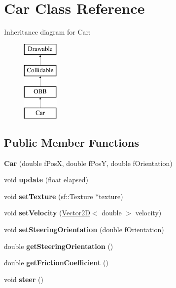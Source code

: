 \hypertarget{class_car}{}\section{Car Class Reference}
\label{class_car}
Inheritance diagram for Car\+:\begin{figure}[H]
\begin{center}
\leavevmode
\includegraphics[height=4.000000cm]{class_car}
\end{center}
\end{figure}
\subsection*{Public Member Functions}
\begin{DoxyCompactItemize}
\item 
\hypertarget{class_car_a9be5c5406459bc96efcb7378909e5834}{}{\bfseries Car} (double f\+Pos\+X, double f\+Pos\+Y, double f\+Orientation)\label{class_car_a9be5c5406459bc96efcb7378909e5834}

\item 
\hypertarget{class_car_ab7860fcfd5e75787d358128e04442464}{}void {\bfseries update} (float elapsed)\label{class_car_ab7860fcfd5e75787d358128e04442464}

\item 
\hypertarget{class_car_a12fd8199fd3380b685f28b0c63a65b7e}{}void {\bfseries set\+Texture} (sf\+::\+Texture $\ast$texture)\label{class_car_a12fd8199fd3380b685f28b0c63a65b7e}

\item 
\hypertarget{class_car_ac5fffcaa49fe357439427c37cb146c26}{}void {\bfseries set\+Velocity} (\hyperlink{class_vector2_d}{Vector2\+D}$<$ double $>$ velocity)\label{class_car_ac5fffcaa49fe357439427c37cb146c26}

\item 
\hypertarget{class_car_ae51f876eddd99c7d9b597d069ea4c505}{}void {\bfseries set\+Steering\+Orientation} (double f\+Orientation)\label{class_car_ae51f876eddd99c7d9b597d069ea4c505}

\item 
\hypertarget{class_car_a78cf0a9ccbbd8d4e51ed89b0afbc8895}{}double {\bfseries get\+Steering\+Orientation} ()\label{class_car_a78cf0a9ccbbd8d4e51ed89b0afbc8895}

\item 
\hypertarget{class_car_a47fe72f08097245751cd5c6eea31a9cb}{}double {\bfseries get\+Friction\+Coefficient} ()\label{class_car_a47fe72f08097245751cd5c6eea31a9cb}

\item 
\hypertarget{class_car_adeb86c141c0d22ab99c3bafc46f8e6d3}{}void {\bfseries steer} ()\label{class_car_adeb86c141c0d22ab99c3bafc46f8e6d3}

\end{DoxyCompactItemize}
